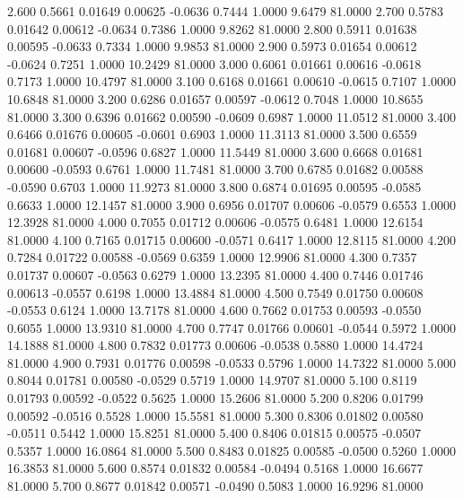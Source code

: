   2.600   0.5661   0.01649   0.00625  -0.0636   0.7444   1.0000   9.6479  81.0000
   2.700   0.5783   0.01642   0.00612  -0.0634   0.7386   1.0000   9.8262  81.0000
   2.800   0.5911   0.01638   0.00595  -0.0633   0.7334   1.0000   9.9853  81.0000
   2.900   0.5973   0.01654   0.00612  -0.0624   0.7251   1.0000  10.2429  81.0000
   3.000   0.6061   0.01661   0.00616  -0.0618   0.7173   1.0000  10.4797  81.0000
   3.100   0.6168   0.01661   0.00610  -0.0615   0.7107   1.0000  10.6848  81.0000
   3.200   0.6286   0.01657   0.00597  -0.0612   0.7048   1.0000  10.8655  81.0000
   3.300   0.6396   0.01662   0.00590  -0.0609   0.6987   1.0000  11.0512  81.0000
   3.400   0.6466   0.01676   0.00605  -0.0601   0.6903   1.0000  11.3113  81.0000
   3.500   0.6559   0.01681   0.00607  -0.0596   0.6827   1.0000  11.5449  81.0000
   3.600   0.6668   0.01681   0.00600  -0.0593   0.6761   1.0000  11.7481  81.0000
   3.700   0.6785   0.01682   0.00588  -0.0590   0.6703   1.0000  11.9273  81.0000
   3.800   0.6874   0.01695   0.00595  -0.0585   0.6633   1.0000  12.1457  81.0000
   3.900   0.6956   0.01707   0.00606  -0.0579   0.6553   1.0000  12.3928  81.0000
   4.000   0.7055   0.01712   0.00606  -0.0575   0.6481   1.0000  12.6154  81.0000
   4.100   0.7165   0.01715   0.00600  -0.0571   0.6417   1.0000  12.8115  81.0000
   4.200   0.7284   0.01722   0.00588  -0.0569   0.6359   1.0000  12.9906  81.0000
   4.300   0.7357   0.01737   0.00607  -0.0563   0.6279   1.0000  13.2395  81.0000
   4.400   0.7446   0.01746   0.00613  -0.0557   0.6198   1.0000  13.4884  81.0000
   4.500   0.7549   0.01750   0.00608  -0.0553   0.6124   1.0000  13.7178  81.0000
   4.600   0.7662   0.01753   0.00593  -0.0550   0.6055   1.0000  13.9310  81.0000
   4.700   0.7747   0.01766   0.00601  -0.0544   0.5972   1.0000  14.1888  81.0000
   4.800   0.7832   0.01773   0.00606  -0.0538   0.5880   1.0000  14.4724  81.0000
   4.900   0.7931   0.01776   0.00598  -0.0533   0.5796   1.0000  14.7322  81.0000
   5.000   0.8044   0.01781   0.00580  -0.0529   0.5719   1.0000  14.9707  81.0000
   5.100   0.8119   0.01793   0.00592  -0.0522   0.5625   1.0000  15.2606  81.0000
   5.200   0.8206   0.01799   0.00592  -0.0516   0.5528   1.0000  15.5581  81.0000
   5.300   0.8306   0.01802   0.00580  -0.0511   0.5442   1.0000  15.8251  81.0000
   5.400   0.8406   0.01815   0.00575  -0.0507   0.5357   1.0000  16.0864  81.0000
   5.500   0.8483   0.01825   0.00585  -0.0500   0.5260   1.0000  16.3853  81.0000
   5.600   0.8574   0.01832   0.00584  -0.0494   0.5168   1.0000  16.6677  81.0000
   5.700   0.8677   0.01842   0.00571  -0.0490   0.5083   1.0000  16.9296  81.0000
